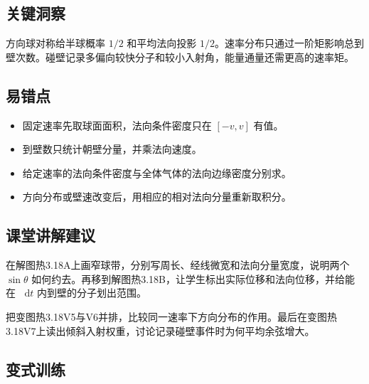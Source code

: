 \documentclass[UTF8,fontset=fandol,a4paper,11pt]{ctexart}
\newcommand{\dd}{\mathop{}\!\mathrm{d}}
\begin{document}


\subsection*{关键洞察}

方向球对称给半球概率 $1/2$ 和平均法向投影 $1/2$。速率分布只通过一阶矩影响总到壁次数。碰壁记录多偏向较快分子和较小入射角，能量通量还需更高的速率矩。



\subsection*{易错点}

\begin{itemize}
\item 固定速率先取球面面积，法向条件密度只在 $[-v,v]$ 有值。
\item 到壁数只统计朝壁分量，并乘法向速度。
\item 给定速率的法向条件密度与全体气体的法向边缘密度分别求。
\item 方向分布或壁速改变后，用相应的相对法向分量重新取积分。
\end{itemize}



\subsection*{课堂讲解建议}

在解图热3.18A上画窄球带，分别写周长、经线微宽和法向分量宽度，说明两个 $\sin\theta$ 如何约去。再移到解图热3.18B，让学生标出实际位移和法向位移，并给能在 $\dd t$ 内到壁的分子划出范围。

把变图热3.18V5与V6并排，比较同一速率下方向分布的作用。最后在变图热3.18V7上读出倾斜入射权重，讨论记录碰壁事件时为何平均余弦增大。



\subsection*{变式训练}
\end{document}
